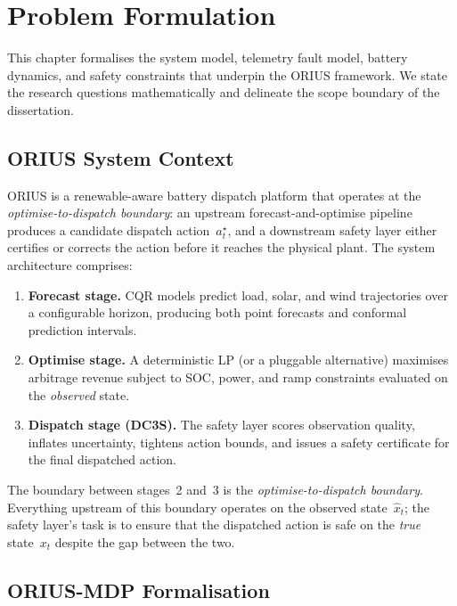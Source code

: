 
\chapter{Problem Formulation}
\label{ch:problem-formulation}

This chapter formalises the system model, telemetry fault model, battery
dynamics, and safety constraints that underpin the ORIUS framework.  We
state the research questions mathematically and delineate the scope
boundary of the dissertation.

\section{ORIUS System Context}
\label{sec:orius-context}

ORIUS is a renewable-aware battery dispatch platform that operates at
the \emph{optimise-to-dispatch boundary}: an upstream forecast-and-optimise
pipeline produces a candidate dispatch action~$a_t^{\star}$, and a
downstream safety layer either certifies or corrects the action before it
reaches the physical plant.  The system architecture comprises:

\begin{enumerate}
  \item \textbf{Forecast stage.}  CQR models predict load, solar, and
    wind trajectories over a configurable horizon, producing both point
    forecasts and conformal prediction intervals.
  \item \textbf{Optimise stage.}  A deterministic LP (or a pluggable
    alternative) maximises arbitrage revenue subject to SOC, power, and
    ramp constraints evaluated on the \emph{observed} state.
  \item \textbf{Dispatch stage (DC3S).}  The safety layer scores
    observation quality, inflates uncertainty, tightens action bounds, and
    issues a safety certificate for the final dispatched action.
\end{enumerate}

The boundary between stages~2 and~3 is the \emph{optimise-to-dispatch
boundary}.  Everything upstream of this boundary operates on the observed
state~$\hat{x}_t$; the safety layer's task is to ensure that the
dispatched action is safe on the \emph{true} state~$x_t$ despite the gap
between the two.

\section{ORIUS-MDP Formalisation}
\label{sec:orius-mdp}

